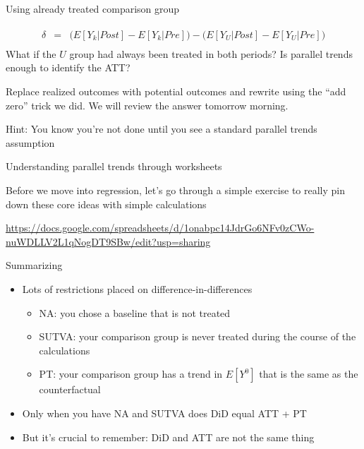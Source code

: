 \documentclass{beamer}
\begin{document}
\begin{frame}{Using already treated comparison group}


\begin{eqnarray*}
\widehat{\delta} &=& \bigg ( E[Y_k|Post] - E[Y_k|Pre] \bigg ) - \bigg ( E[Y_U | Post ] - E[ Y_U | Pre] \bigg) \\
\end{eqnarray*}What if the $U$ group had always been treated in both periods? Is parallel trends enough to identify the ATT?

\bigskip

Replace realized outcomes with potential outcomes and rewrite using the ``add zero'' trick we did.  We will review the answer tomorrow morning.

\bigskip

Hint: You know you're not done until you see a standard parallel trends assumption


\end{frame}











\begin{frame}{Understanding parallel trends through worksheets}

Before we move into regression, let's go through a simple exercise to really pin down these core ideas with simple calculations

\bigskip 

\url{https://docs.google.com/spreadsheets/d/1onabpc14JdrGo6NFv0zCWo-nuWDLLV2L1qNogDT9SBw/edit?usp=sharing}

\end{frame}



\begin{frame}{Summarizing}

\begin{itemize}

\item Lots of restrictions placed on difference-in-differences
	\begin{itemize}
	\item NA: you chose a baseline that is not treated
	\item SUTVA: your comparison group is never treated during the course of the calculations
	\item PT: your comparison group has a trend in $E[Y^0]$ that is the same as the counterfactual 
	\end{itemize}
\item Only when you have NA and SUTVA does DiD equal ATT + PT
\item But it's crucial to remember: DiD and ATT are not the same thing

\end{itemize}

\end{frame}
\end{document}
